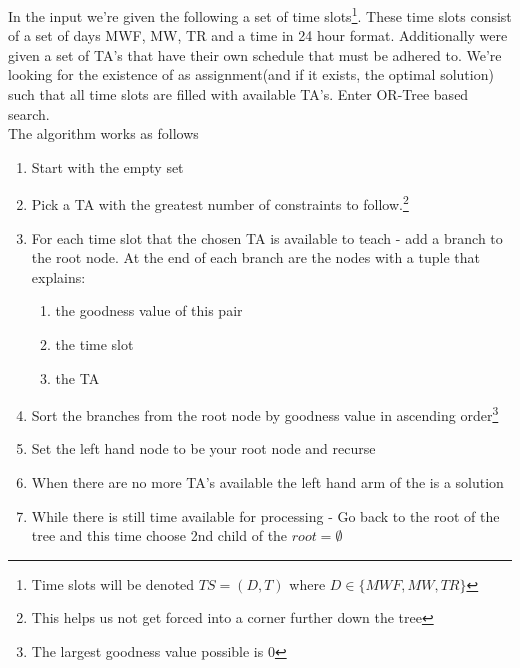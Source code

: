 \documentclass{article}
\begin{document}
In the input we're given the following a set of time
slots\footnote{Time slots will be denoted $TS = (D, T)$ where $D \in
  \{MWF, MW, TR\}$}. These time slots consist of a set of days MWF,
MW, TR and a time in 24 hour format. Additionally were given a set of
TA's that have their own schedule that must be adhered to. We're
looking for the existence of as assignment(and if it exists, the
optimal solution) such that all time slots are filled with available
TA's. Enter OR-Tree based search.\\

The algorithm works as follows

\begin{enumerate}

\item Start with the empty set

\item Pick a TA with the greatest number of constraints to
  follow.\footnote{This helps us not get forced into a corner further
    down the tree}

\item For each time slot that the chosen TA is available to teach -
  add a branch to the root node. At the end of each branch are the
  nodes with a tuple that explains:
  
  \begin{enumerate}

  \item the goodness value of this pair
    
  \item the time slot

  \item the TA

  \end{enumerate}

\item Sort the branches from the root node by goodness value in
  ascending order\footnote{The largest goodness value possible is 0}


\item Set the left hand node to be your root node and recurse

\item When there are no more TA's available the left hand arm of the
  is a solution

\item While there is still time available for processing - Go back to
  the root of the tree and this time choose 2nd child of the $root = \emptyset$

\end{enumerate}
\end{document}
